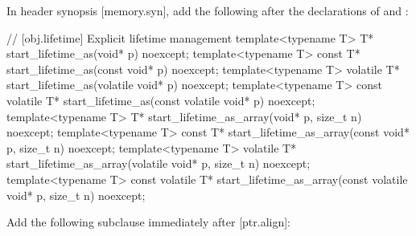 In header  synopsis [memory.syn], add the following after the declarations of  and :


\begin{addedblock}
\begin{codeblock}
// [obj.lifetime] Explicit lifetime management
template<typename T>
  T* start_lifetime_as(void* p) noexcept;
template<typename T>
  const T* start_lifetime_as(const void* p) noexcept;
template<typename T>
  volatile T* start_lifetime_as(volatile void* p) noexcept;
template<typename T>
  const volatile T* start_lifetime_as(const volatile void* p) noexcept;
template<typename T>
  T* start_lifetime_as_array(void* p, size_t n) noexcept;
template<typename T>
  const T* start_lifetime_as_array(const void* p, size_t n) noexcept;
template<typename T>
  volatile T* start_lifetime_as_array(volatile void* p, size_t n) noexcept;
template<typename T>
  const volatile T* start_lifetime_as_array(const volatile void* p, size_t n) noexcept;
\end{codeblock}
\end{addedblock}

Add the following subclause immediately after [ptr.align]:

